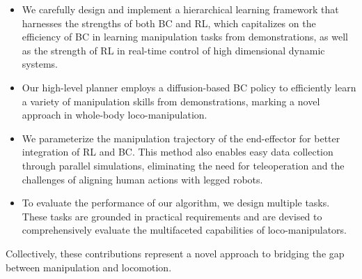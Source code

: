 \begin{itemize}

\item We carefully design and implement a hierarchical learning framework that harnesses the strengths of both BC and RL, which capitalizes on the efficiency of BC in learning manipulation tasks from demonstrations, as well as the strength of RL in real-time control of high dimensional dynamic systems.

\item Our high-level planner employs a diffusion-based BC policy to efficiently learn a variety of manipulation skills from demonstrations, marking a novel approach in whole-body loco-manipulation.

\item We parameterize the manipulation trajectory of the end-effector for better integration of RL and BC. This method also enables easy data collection through parallel simulations, eliminating the need for teleoperation and the challenges of aligning human actions with legged robots.

\item To evaluate the performance of our algorithm, we design multiple tasks.
These tasks are grounded in practical requirements and are devised to comprehensively evaluate the multifaceted capabilities of loco-manipulators.

\end{itemize}

Collectively, these contributions represent a novel approach to bridging the gap between manipulation and locomotion.
